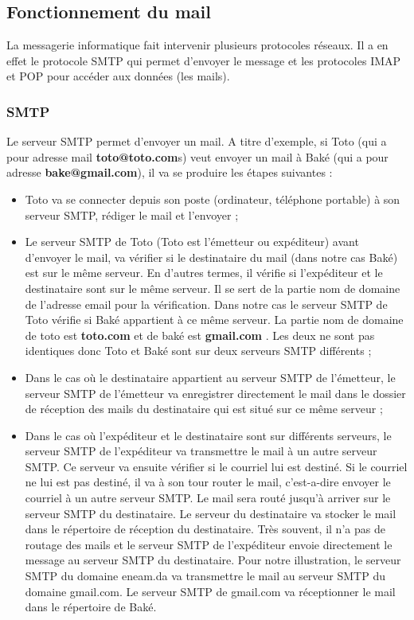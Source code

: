 \documentclass[a4paper,12pt,french]{report} %
\begin{document}
\subsection{Fonctionnement du mail}
La messagerie informatique fait intervenir plusieurs protocoles réseaux. Il a en effet le protocole SMTP qui permet d'envoyer le message et les protocoles IMAP et POP pour accéder aux données (les mails).
\subsubsection{SMTP}
Le serveur SMTP permet d'envoyer un mail. A titre d'exemple, si Toto (qui a pour adresse mail \textbf{toto@toto.com}s) veut envoyer un mail à Baké (qui a pour adresse \textbf{bake@gmail.com}), il va se produire les étapes suivantes :
\begin{itemize}
	\item Toto va se connecter depuis son poste (ordinateur, téléphone portable) à son serveur SMTP, rédiger le mail et l'envoyer ;
	\item Le serveur SMTP de Toto (Toto est l'émetteur ou expéditeur) avant  d'envoyer le mail, va vérifier  si le destinataire du mail (dans notre cas Baké) est sur le même serveur. En d'autres termes, il vérifie si l'expéditeur et le destinataire sont sur le même serveur. Il se sert de la partie nom de domaine de l'adresse email pour la vérification. Dans notre cas le serveur SMTP de Toto vérifie si Baké appartient à ce même serveur. La partie nom de domaine de toto est \textbf{toto.com} et de baké est \textbf{gmail.com} . Les deux ne sont pas identiques donc Toto et Baké sont sur deux serveurs SMTP différents ;
	\item Dans le cas où le destinataire appartient au serveur SMTP de l'émetteur, le serveur SMTP de l'émetteur va enregistrer directement le mail dans le dossier de réception des mails du destinataire qui est situé sur ce même serveur ;
	\item Dans le cas où l'expéditeur et le destinataire sont sur différents serveurs, le serveur SMTP de l'expéditeur va transmettre le mail à un autre serveur SMTP. Ce serveur va ensuite vérifier si le courriel lui est destiné. Si le courriel ne lui est pas destiné,  il va à son tour router le mail, c'est-a-dire envoyer le courriel à un autre serveur SMTP. Le mail sera routé jusqu'à arriver sur le serveur SMTP du destinataire. Le serveur du destinataire va stocker le mail dans le répertoire de réception du destinataire. Très souvent, il n'a pas de routage des mails et le serveur SMTP de l'expéditeur envoie directement le message au serveur SMTP du destinataire. Pour notre illustration, le serveur SMTP du domaine eneam.da va transmettre le mail au serveur SMTP du domaine gmail.com. Le serveur SMTP de gmail.com va réceptionner le mail dans le répertoire de Baké.

\end{itemize}
\end{document}
